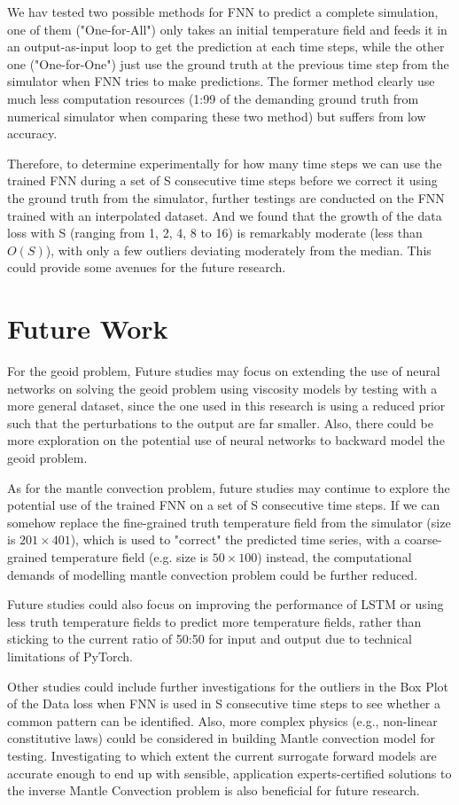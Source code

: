 We hav tested two possible methods for FNN to predict a complete simulation, one of them ("One-for-All") only takes an initial temperature field and feeds it in an output-as-input loop to get the prediction at each time steps, while the other one ("One-for-One") just use the ground truth at the previous time step from the simulator when FNN tries to make predictions. The former method clearly use much less computation resources (1:99 of the demanding ground truth from numerical simulator when comparing these two method) but suffers from low accuracy.

Therefore, to determine experimentally for how many time steps we can use the trained FNN during a set of S consecutive time steps before we correct it using the ground truth from the simulator, further testings are conducted on the FNN trained with an interpolated dataset. And we found that the growth of the data loss with S (ranging from 1, 2, 4, 8 to 16) is remarkably moderate (less than $O(S)$), with only a few outliers deviating moderately from the median. This could provide some avenues for the future research.

\section{Future Work}

For the geoid problem, Future studies may focus on extending the use of neural networks on solving the geoid problem using viscosity models by testing with a more general dataset, since the one used in this research is using a reduced prior such that the perturbations to the output are far smaller. Also, there could be more exploration on the potential use of neural networks to backward model the geoid problem.


As for the mantle convection problem, future studies may continue to explore the potential use of the trained FNN on a set of S consecutive time steps. If we can somehow replace the fine-grained truth temperature field from the simulator (size is $201 \times 401$), which is used to "correct" the predicted time series, with a coarse-grained temperature field (e.g. size is $50 \times 100$) instead, the computational demands of modelling mantle convection problem could be further reduced.

Future studies could also focus on improving the performance of LSTM or using less truth temperature fields to predict more temperature fields, rather than sticking to the current ratio of 50:50 for input and output due to technical limitations of PyTorch.

Other studies could include further investigations for the outliers in the Box Plot of the Data loss when FNN is used in S consecutive time steps to see whether a common pattern can be identified. Also, more complex physics (e.g., non-linear constitutive laws) could be considered in building Mantle convection model for testing. Investigating to which extent the current surrogate forward models are accurate enough to end up with sensible, application experts-certified solutions to the inverse Mantle Convection problem is also beneficial for future research.